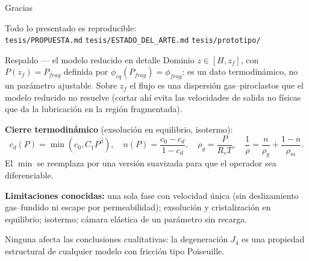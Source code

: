 \documentclass[aspectratio=169,10pt,t]{beamer}
\begin{document}
\begin{frame}[standout]
Gracias

\vspace{1em}
{\small\normalfont
Todo lo presentado es reproducible:\\
\texttt{tesis/PROPUESTA.md}\quad
\texttt{tesis/ESTADO\_DEL\_ARTE.md}\quad
\texttt{tesis/prototipo/}}
\end{frame}

\appendix

\begin{frame}{Respaldo — el modelo reducido en detalle}
\small
Dominio $z\in[H,z_f]$, con $P(z_f)=P_{frag}$ definida por
$\phi_{eq}(P_{frag})=\phi_{frag}$: es un dato termodinámico, no un parámetro
ajustable. Sobre $z_f$ el flujo es una dispersión gas–piroclastos que el modelo
reducido no resuelve (cortar ahí evita las velocidades de salida no físicas que
da la lubricación en la región fragmentada).

\medskip
\textbf{Cierre termodinámico} (exsolución en equilibrio, isotermo):
$$c_d(P)=\min(c_0,C_1P^\beta),\quad n(P)=\frac{c_0-c_d}{1-c_d},\quad
\rho_g=\frac{P}{R_vT},\quad \frac1\rho=\frac{n}{\rho_g}+\frac{1-n}{\rho_m}.$$
El $\min$ se reemplaza por una versión suavizada para que el operador sea
diferenciable.

\medskip
\textbf{Limitaciones conocidas:} una sola fase con velocidad única (sin
deslizamiento gas–fundido ni escape por permeabilidad); exsolución y
cristalización en equilibrio; isotermo; cámara elástica de un parámetro sin
recarga.

\medskip
Ninguna afecta las conclusiones cualitativas: \alert{la degeneración $J_4$ es
una propiedad estructural de cualquier modelo con fricción tipo Poiseuille.}
\end{frame}
\end{document}
